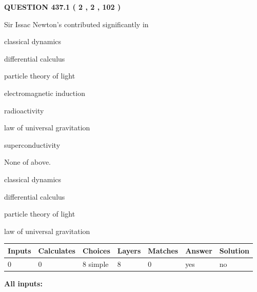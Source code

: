 \documentclass[12pt]{article}
\begin{document}
{\textbf{\Large{QUESTION
437.1 
 ( 2 , 2 , 102 )
}}}
  
  
Sir Issac Newton's contributed significantly in
 
 
classical dynamics
 
 
differential calculus
 
 
particle theory of light
 
 
electromagnetic induction
 
 
radioactivity
 
 
law of universal gravitation
 
 
superconductivity
 
 
 None of above.
 
 
\noindent{}
 
 
classical dynamics
 
 
differential calculus
 
 
particle theory of light
 
 
law of universal gravitation
 
 
\noindent{}
 
 
   
   
   
   
\noindent\begin{tabular}{|l|l|l|l|l|l|l|}
 \hline
Inputs & Calculates & Choices & Layers & Matches & Answer & Solution \\ \hline
 0  & 
 0  & 
 8
  simple  
  & 
 8  & 
 0  & 
  yes & 
  no 
  \\ \hline
 \end{tabular}
   
   
   
   
\noindent{}
   
   
   
   
\noindent\vspace{0.1in}\hspace{-0.08in} {\textbf{\Large{All inputs: }}}
   
\end{document}
